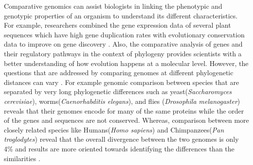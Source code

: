 Comparative genomics can assist biologists in linking the phenotypic and genotypic properties of an organism to understand its different characteristics. For example, researchers combined the gene expression data of several plant sequences which have high gene duplication rates with evolutionary conservation data to improve on gene discovery \cite{hanada2008importance}. Also, the comparative analysis of genes and their regulatory pathways in the context of phylogeny provides scientists with a better understanding of how evolution happens at a molecular level\cite{soltis2003role}. However, the questions that are addressed by comparing genomes at different phylogenetic distances can vary \cite{hardison2003comparative}. For example genomic comparison between species that are separated by very long phylogenetic differences such as yeast(\textit{Saccharomyces cerevisiae}), worms(\textit{Caenorhabditis
elegans}), and flies (\textit{Drosophila melanogaster}) reveals that their genomes encode for many of the same proteins while the order of the genes and sequences are not conserved\cite{rubin2000comparative}. Whereas, comparison between more closely related species like Humans(\textit{Homo sapiens}) and Chimpanzees(\textit{Pan troglodytes}) reveal that the overall divergence between the two genomes is only 4\% and results are more oriented towards identifying the differences than the similarities \cite{varki2005comparing}. 

